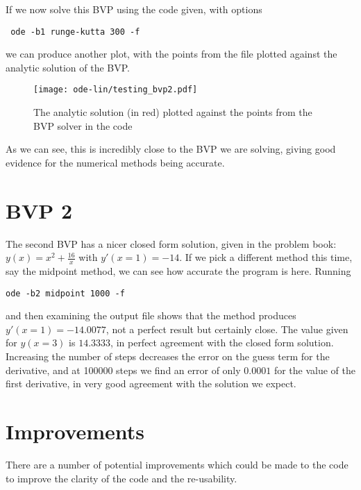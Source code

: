 \documentclass[a4paper,11pt]{report}
\begin{document}
{{{If we now solve this BVP using the code given, with options \begin{center} \begin{verbatim} ode -b1 runge-kutta 300 -f \end{verbatim} \end{center} we can produce another plot, with the points from the file plotted against the analytic solution of the BVP.

\begin{landscape}

\pagestyle{empty}
\begin{figure}[H]
\texttt{[image: ode-lin/testing\_bvp2.pdf]}
\caption{The analytic solution (in red) plotted against the points from the BVP solver in the code}
\end{figure}

\end{landscape}

As we can see, this is incredibly close to the BVP we are solving, giving good evidence for the numerical methods being accurate.

\section{BVP 2}

The second BVP has a nicer closed form solution, given in the problem book: $y(x) = x^2 + \frac{16}{x}$ with $y'(x=1) = -14$. If we pick a different method this time, say the midpoint method, we can see how accurate the program is here. Running
\begin{center}
\begin{verbatim}
ode -b2 midpoint 1000 -f
\end{verbatim}
\end{center}
and then examining the output file shows that the method produces $y'(x=1) = -14.0077$, not a perfect result but certainly close. The value given for $y(x=3)$ is $14.3333$, in perfect agreement with the closed form solution. Increasing the number of steps decreases the error on the guess term for the derivative, and at 100000 steps we find an error of only $0.0001$ for the value of the first derivative, in very good agreement with the solution we expect.

\section{Improvements}

There are a number of potential improvements which could be made to the code to improve the clarity of the code and the re-usability.

}}}
\end{document}
